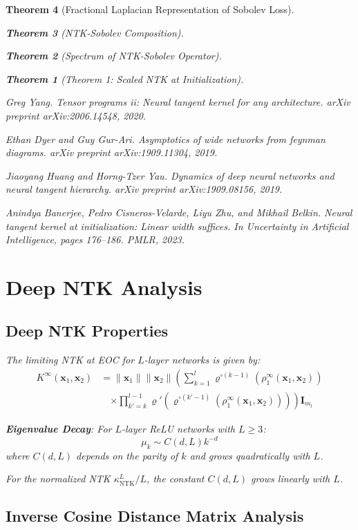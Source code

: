 \documentclass{article}
\newtheorem{theorem}{Theorem}[section]
\begin{document}
\begin{theorem}[Fractional Laplacian Representation of Sobolev Loss]
\begin{theorem}[NTK-Sobolev Composition]
\begin{theorem}[Spectrum of NTK-Sobolev Operator]
\begin{theorem}[Theorem 1: Scaled NTK at Initialization]
\begin{thebibliography}{10}
Greg Yang.
\newblock Tensor programs ii: Neural tangent kernel for any architecture.
\newblock \emph{arXiv preprint arXiv:2006.14548}, 2020.

Ethan Dyer and Guy Gur-Ari.
\newblock Asymptotics of wide networks from feynman diagrams.
\newblock \emph{arXiv preprint arXiv:1909.11304}, 2019.

Jiaoyang Huang and Horng-Tzer Yau.
\newblock Dynamics of deep neural networks and neural tangent hierarchy.
\newblock \emph{arXiv preprint arXiv:1909.08156}, 2019.

Anindya Banerjee, Pedro Cisneros-Velarde, Liyu Zhu, and Mikhail Belkin.
\newblock Neural tangent kernel at initialization: Linear width suffices.
\newblock In \emph{Uncertainty in Artificial Intelligence}, pages 176--186. PMLR, 2023.

\end{thebibliography}

\section{Deep NTK Analysis}

\subsection{Deep NTK Properties}

The limiting NTK at EOC for $L$-layer networks is given by:
\begin{align}
K^{\infty}(\mathbf{x}_1, \mathbf{x}_2) &= \|\mathbf{x}_1\| \|\mathbf{x}_2\| \left( \sum_{k=1}^l \varrho^{\circ (k-1)}\left(\rho_1^{\infty}(\mathbf{x}_1, \mathbf{x}_2)\right) \right. \\
&\quad \left. \times \prod_{k'=k}^{l-1} \varrho'\left(\varrho^{\circ (k'-1)}\left(\rho_1^{\infty}(\mathbf{x}_1, \mathbf{x}_2)\right)\right) \right) \mathbf{I}_{m_l}
\end{align}

\textbf{Eigenvalue Decay}: For $L$-layer ReLU networks with $L \geq 3$:
\[ \mu_k \sim C(d, L)k^{-d} \]
where $C(d, L)$ depends on the parity of $k$ and grows quadratically with $L$.

For the normalized NTK $\kappa^L_{\text{NTK}}/L$, the constant $C(d, L)$ grows linearly with $L$.

\subsection{Inverse Cosine Distance Matrix Analysis}


\end{theorem}
\end{theorem}
\end{theorem}
\end{theorem}
\end{document}
